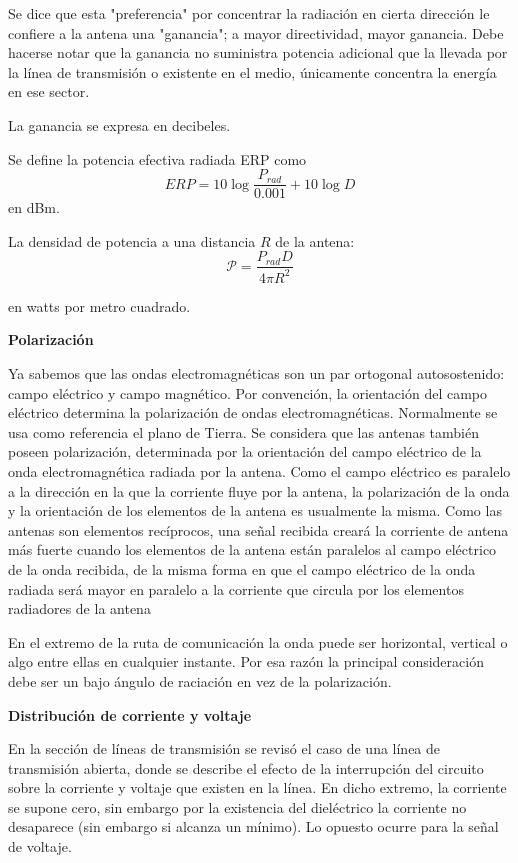 \documentclass[12pt,letterpaper,titlepage,twoside]{book}
\begin{document}
Se dice que esta "preferencia" por concentrar la radiación en cierta dirección le confiere a la antena una "ganancia"; a mayor directividad, mayor ganancia. Debe hacerse notar que la ganancia no suministra potencia adicional que la llevada por la línea de transmisión o existente en el medio, únicamente concentra la energía en ese sector.

La ganancia se expresa en decibeles.

Se define la potencia efectiva radiada ERP como
\begin{equation}
ERP = 10 \log \frac{P_{rad}}{0.001} + 10 \log D
\end{equation}
 en dBm.
 
 La densidad de potencia a una distancia $R$ de la antena:
 \begin{equation}
  \mathcal{P} = \frac{P_{rad} D}{4 \pi R^2}
  \end{equation} 
  
  en watts por metro cuadrado.
  
  \textbf{Polarización}
  
  Ya sabemos que las ondas electromagnéticas son un par ortogonal autosostenido: campo eléctrico y campo magnético. Por convención, la orientación del campo eléctrico determina la polarización de ondas electromagnéticas. Normalmente se usa como referencia el plano de Tierra. Se considera que las antenas también poseen  polarización, determinada por la orientación del campo eléctrico de la onda electromagnética radiada por la antena. Como el campo eléctrico es paralelo a la dirección en la que la corriente fluye por la antena, la polarización de la onda y la orientación de los elementos de la antena es usualmente la misma. 
  Como las antenas son elementos recíprocos, una señal recibida creará la corriente de antena más fuerte cuando los elementos de la antena están paralelos al campo eléctrico de la onda recibida, de la misma forma en que el campo eléctrico de la onda radiada será mayor en paralelo a la corriente que circula por los elementos radiadores de la antena
  
  En el extremo de la ruta de comunicación la onda puede ser horizontal, vertical o algo entre ellas en cualquier instante. Por esa razón la principal consideración debe ser un bajo ángulo de raciación en vez de la polarización.

\textbf{Distribución de corriente y voltaje}

En la sección de líneas de transmisión se revisó el caso de una línea de transmisión abierta, donde se describe el efecto de la interrupción del circuito sobre la corriente y voltaje que existen en la línea. En dicho extremo, la corriente se supone cero, sin embargo por la existencia del dieléctrico la corriente no desaparece (sin embargo si alcanza un mínimo). Lo opuesto ocurre para la señal de voltaje.
\end{document}
